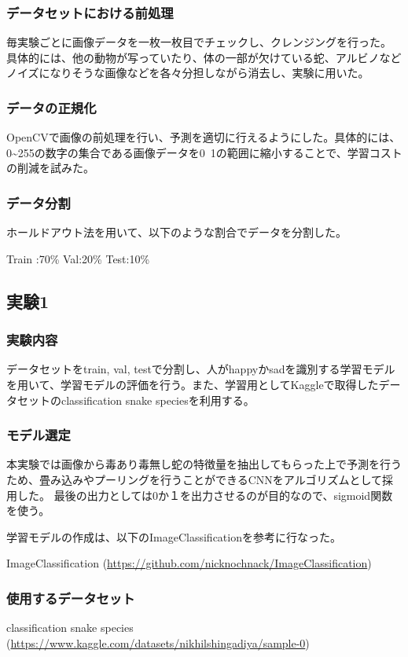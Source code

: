 \documentclass[a4paper, 11pt, titlepage]{jsarticle}
\begin{document}
\subsubsection{データセットにおける前処理}
毎実験ごとに画像データを一枚一枚目でチェックし、クレンジングを行った。\\
具体的には、他の動物が写っていたり、体の一部が欠けている蛇、アルビノなどノイズになりそうな画像などを各々分担しながら消去し、実験に用いた。

\subsubsection{データの正規化}
OpenCVで画像の前処理を行い、予測を適切に行えるようにした。具体的には、0\textasciitilde255の数字の集合である画像データを0~1の範囲に縮小することで、学習コストの削減を試みた。

\subsubsection{データ分割}
ホールドアウト法を用いて、以下のような割合でデータを分割した。\par
Train :70\%
Val:20\%
Test:10\%


\subsection{実験1}
\subsubsection{実験内容}
データセットをtrain, val, testで分割し、人がhappyかsadを識別する学習モデルを用いて、学習モデルの評価を行う。また、学習用としてKaggleで取得したデータセットのclassification snake speciesを利用する。\par

\subsubsection{モデル選定}
本実験では画像から毒あり毒無し蛇の特徴量を抽出してもらった上で予測を行うため、畳み込みやプーリングを行うことができるCNNをアルゴリズムとして採用した。
最後の出力としては0か１を出力させるのが目的なので、sigmoid関数を使う。\par
学習モデルの作成は、以下のImageClassificationを参考に行なった。\par
ImageClassification (\url{https://github.com/nicknochnack/ImageClassification})

\subsubsection{使用するデータセット}
classification snake species (\url{https://www.kaggle.com/datasets/nikhilshingadiya/sample-0})
\end{document}
